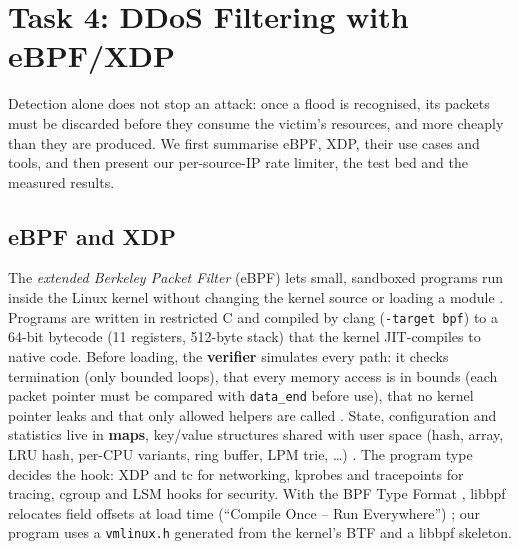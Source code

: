 \chapter{Task 4: DDoS Filtering with eBPF/XDP}\label{ch:task4}

Detection alone does not stop an attack: once a flood is recognised, its packets must be discarded before they consume the victim's resources, and more cheaply than they are produced. We first summarise eBPF, XDP, their use cases and tools, and then present our per-source-IP rate limiter, the test bed and the measured results.

\section{eBPF and XDP}\label{sec:t4-ebpf}\label{sec:t4-xdp}
The \emph{extended Berkeley Packet Filter} (eBPF) lets small, sandboxed programs run inside the Linux kernel without changing the kernel source or loading a module \autocite{kdoc_bpf,ebpf_what}. Programs are written in restricted C and compiled by clang (\texttt{-target bpf}) to a 64-bit bytecode (11 registers, 512-byte stack) that the kernel JIT-compiles to native code. Before loading, the \textbf{verifier} simulates every path: it checks termination (only bounded loops), that every memory access is in bounds (each packet pointer must be compared with \texttt{data\_end} before use), that no kernel pointer leaks and that only allowed helpers are called \autocite{kdoc_verifier}. State, configuration and statistics live in \textbf{maps}, key/value structures shared with user space (hash, array, LRU hash, per-CPU variants, ring buffer, LPM trie, \dots) \autocite{kdoc_maps,kdoc_maphash}. The program type decides the hook: XDP and tc for networking, kprobes and tracepoints for tracing, cgroup and LSM hooks for security. With the BPF Type Format \autocite{kdoc_btf}, libbpf relocates field offsets at load time (\enquote{Compile Once -- Run Everywhere}) \autocite{nakryiko_core}; our program uses a \texttt{vmlinux.h} generated from the kernel's BTF and a libbpf skeleton.

